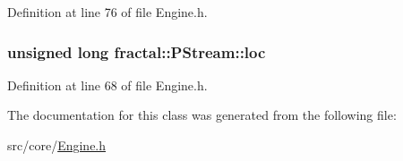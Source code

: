 Definition at line 76 of file Engine.\+h.

\hypertarget{classfractal_1_1PStream_a552ad139e6d6591c02c86df3f94905ea}{
\subsubsection[{loc}]{\setlength{\rightskip}{0pt plus 5cm}unsigned long fractal\+::\+P\+Stream\+::loc}}\label{classfractal_1_1PStream_a552ad139e6d6591c02c86df3f94905ea}


Definition at line 68 of file Engine.\+h.



The documentation for this class was generated from the following file\+:\begin{DoxyCompactItemize}
\item 
src/core/\hyperlink{Engine_8h}{Engine.\+h}\end{DoxyCompactItemize}
